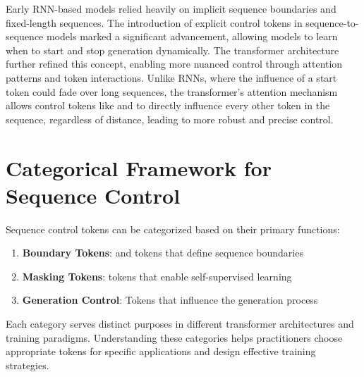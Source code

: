 Early RNN-based models relied heavily on implicit sequence boundaries and fixed-length sequences. The introduction of explicit control tokens in sequence-to-sequence models marked a significant advancement, allowing models to learn when to start and stop generation dynamically. The transformer architecture further refined this concept, enabling more nuanced control through attention patterns and token interactions. Unlike RNNs, where the influence of a start token could fade over long sequences, the transformer's attention mechanism allows control tokens like \sos{} and \eos{} to directly influence every other token in the sequence, regardless of distance, leading to more robust and precise control.
\begin{comment}
Feedback: This is a good historical overview. To make the "transformer" advantage more concrete, you could add a sentence explaining *how* attention made a difference. For example: "Unlike RNNs, where the influence of a start token could fade over long sequences, the transformer's attention mechanism allows control tokens like [SOS] and [EOS] to directly influence every other token in the sequence, regardless of distance, leading to more robust and precise control."

STATUS: addressed - added explanation of how attention mechanism enables better sequence control compared to RNNs
\end{comment}

\section{Categorical Framework for Sequence Control}

Sequence control tokens can be categorized based on their primary functions:

\begin{enumerate}
\item \textbf{Boundary Tokens}: \sos{} and \eos{} tokens that define sequence boundaries
\item \textbf{Masking Tokens}: \mask{} tokens that enable self-supervised learning
\item \textbf{Generation Control}: Tokens that influence the generation process
\end{enumerate}

Each category serves distinct purposes in different transformer architectures and training paradigms. Understanding these categories helps practitioners choose appropriate tokens for specific applications and design effective training strategies.

